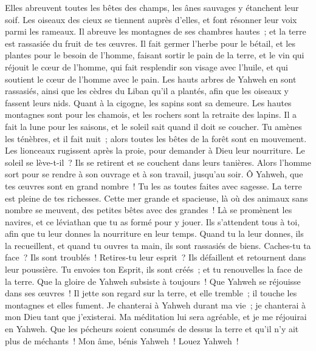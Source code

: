 \begin{multicols}{2}
Elles abreuvent toutes les bêtes des champs, les ânes sauvages y étanchent leur soif.
Les oiseaux des cieux se tiennent auprès d'elles, et font résonner leur voix parmi les rameaux.
Il abreuve les montagnes de ses chambres hautes~; et la terre est rassasiée du fruit de tes œuvres.
Il fait germer l'herbe pour le bétail, et les plantes pour le besoin de l'homme, faisant sortir le pain de la terre,
et le vin qui réjouit le cœur de l'homme, qui fait resplendir son visage avec l'huile, et qui soutient le cœur de l'homme avec le pain.
Les hauts arbres de Yahweh en sont rassasiés, ainsi que les cèdres du Liban qu'il a plantés,
afin que les oiseaux y fassent leurs nids. Quant à la cigogne, les sapins sont sa demeure.
Les hautes montagnes sont pour les chamois, et les rochers sont la retraite des lapins.
Il a fait la lune pour les saisons, et le soleil sait quand il doit se coucher.
Tu amènes les ténèbres, et il fait nuit~; alors toutes les bêtes de la forêt sont en mouvement.
Les lionceaux rugissent après la proie, pour demander à Dieu leur nourriture.
Le soleil se lève-t-il~? Ils se retirent et se couchent dans leurs tanières.
Alors l'homme sort pour se rendre à son ouvrage et à son travail, jusqu'au soir.
Ô Yahweh, que tes œuvres sont en grand nombre~! Tu les as toutes faites avec sagesse. La terre est pleine de tes richesses.
Cette mer grande et spacieuse, là où des animaux sans nombre se meuvent, des petites bêtes avec des grandes~!
Là se promènent les navires, et ce léviathan que tu as formé pour y jouer.
Ils s'attendent tous à toi, afin que tu leur donnes la nourriture en leur temps.
Quand tu la leur donnes, ils la recueillent, et quand tu ouvres ta main, ils sont rassasiés de biens.
Caches-tu ta face~? Ils sont troublés~! Retires-tu leur esprit~? Ils défaillent et retournent dans leur poussière.
Tu envoies ton Esprit, ils sont créés~; et tu renouvelles la face de la terre.
Que la gloire de Yahweh subsiste à toujours~! Que Yahweh se réjouisse dans ses œuvres~!
Il jette son regard sur la terre, et elle tremble~; il touche les montagnes et elles fument.
Je chanterai à Yahweh durant ma vie~; je chanterai à mon Dieu tant que j'existerai.
Ma méditation lui sera agréable, et je me réjouirai en Yahweh.
Que les pécheurs soient consumés de dessus la terre et qu'il n'y ait plus de méchants~! Mon âme, bénis Yahweh~! Louez Yahweh~!

\end{multicols}
